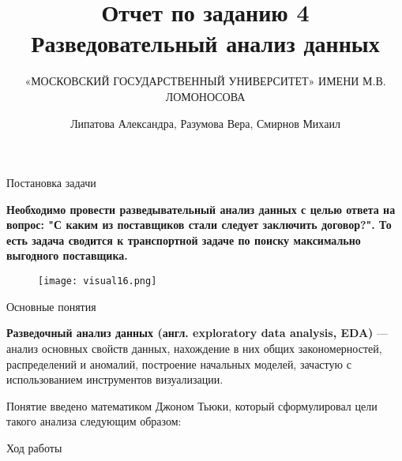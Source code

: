\documentclass{beamer}
\title{Отчет по заданию 4
\newline
Разведовательный анализ данных}
\author{«МОСКОВСКИЙ ГОСУДАРСТВЕННЫЙ УНИВЕРСИТЕТ» ИМЕНИ М.В. ЛОМОНОСОВА}
\date[]{Липатова Александра, Разумова Вера, Смирнов Михаил}
\begin{document}
\begin{frame}
  \titlepage
\end{frame}

\begin{frame}{Постановка задачи}

\begin{center}
    \textbf{Необходимо провести разведывательный анализ данных с целью ответа на вопрос: "С каким из поставщиков стали следует заключить договор?". То есть задача сводится к транспортной задаче по поиску максимально выгодного поставщика.}
\end{center}
\begin{figure}[h]
\centering
\texttt{[image: visual16.png]}
\label{fig:mpr}
\end{figure}
\end{frame}

\begin {frame}{Основные понятия}

\textbf{Разведочный анализ данных (англ. exploratory data analysis, EDA)} — анализ основных свойств данных, нахождение в них общих закономерностей, распределений и аномалий, построение начальных моделей, зачастую с использованием инструментов визуализации.
\newline

Понятие введено математиком Джоном Тьюки, который сформулировал цели такого анализа следующим образом:
\newline
{}
\newline
{}
\newline
{}
\newline
{}
\newline
{}
\newline
{}
\newline

\end{frame}

\begin{frame}{Ход работы}

\newline

\newline

\newline

\newline


\end{frame}
\end{document}
